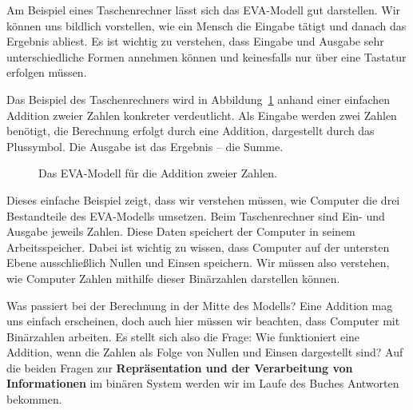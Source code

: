 \documentclass[
  ngerman,
  letterpaper,
  DIV=11]{scrreprt}
\begin{document}
Am Beispiel eines Taschenrechner lässt sich das EVA-Modell gut
darstellen. Wir können uns bildlich vorstellen, wie ein Mensch die
Eingabe tätigt und danach das Ergebnis abliest. Es ist wichtig zu
verstehen, dass Eingabe und Ausgabe sehr unterschiedliche Formen
annehmen können und keinesfalls nur über eine Tastatur erfolgen müssen.

Das Beispiel des Taschenrechners wird in
Abbildung~\ref{fig-example-calculator} anhand einer einfachen Addition
zweier Zahlen konkreter verdeutlicht. Als Eingabe werden zwei Zahlen
benötigt, die Berechnung erfolgt durch eine Addition, dargestellt durch
das Plussymbol. Die Ausgabe ist das Ergebnis -- die Summe.

\begin{figure}


\caption{\label{fig-example-calculator}Das EVA-Modell für die Addition
zweier Zahlen.}

\end{figure}%

Dieses einfache Beispiel zeigt, dass wir verstehen müssen, wie Computer
die drei Bestandteile des EVA-Modells umsetzen. Beim Taschenrechner sind
Ein- und Ausgabe jeweils Zahlen. Diese Daten speichert der Computer in
seinem Arbeitsspeicher. Dabei ist wichtig zu wissen, dass Computer auf
der untersten Ebene ausschließlich Nullen und Einsen speichern. Wir
müssen also verstehen, wie Computer Zahlen mithilfe dieser Binärzahlen
darstellen können.

Was passiert bei der Berechnung in der Mitte des Modells? Eine Addition
mag uns einfach erscheinen, doch auch hier müssen wir beachten, dass
Computer mit Binärzahlen arbeiten. Es stellt sich also die Frage: Wie
funktioniert eine Addition, wenn die Zahlen als Folge von Nullen und
Einsen dargestellt sind? Auf die beiden Fragen zur
\textbf{Repräsentation und der Verarbeitung von Informationen} im
binären System werden wir im Laufe des Buches Antworten bekommen.
\end{document}
